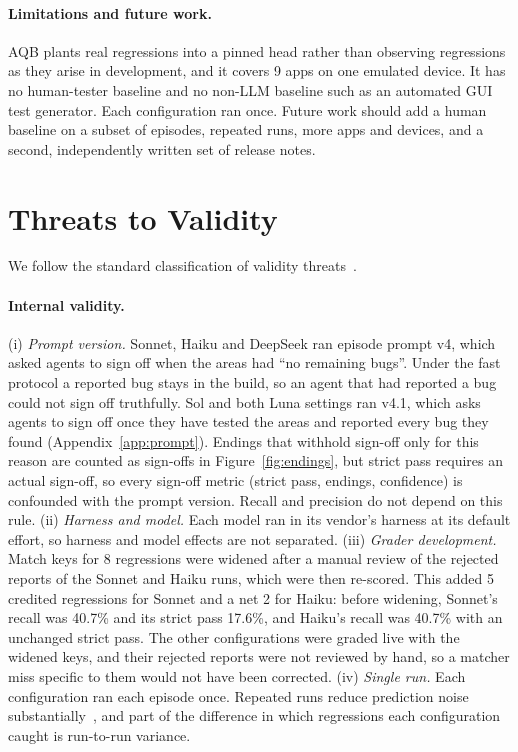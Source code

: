 \documentclass[sigconf]{acmart}
\newcommand{\aqb}{AQB\xspace}
\begin{document}
\paragraph{Limitations and future work.}
\aqb plants real regressions into a pinned head rather than observing regressions as they arise in
development, and it covers 9 apps on one emulated device. It has no human-tester baseline and no
non-LLM baseline such as an automated GUI test generator. Each configuration ran once. Future work
should add a human baseline on a subset of episodes, repeated runs, more apps and devices, and a
second, independently written set of release notes.

\section{Threats to Validity}
\label{sec:threats}
We follow the standard classification of validity threats~\cite{wohlin2012experimentation}.

\paragraph{Internal validity.}
(i) \emph{Prompt version.} Sonnet, Haiku and DeepSeek ran episode prompt v4, which asked agents to sign
off when the areas had ``no remaining bugs''. Under the fast protocol a reported bug stays in the
build, so an agent that had reported a bug could not sign off truthfully. Sol and both Luna settings
ran v4.1, which asks agents to sign off once they have tested the areas and reported every bug they
found (Appendix~\ref{app:prompt}). Endings that withhold sign-off only for this reason are counted as
sign-offs in Figure~\ref{fig:endings}, but strict pass requires an actual sign-off, so every sign-off
metric (strict pass, endings, confidence) is confounded with the prompt version. Recall and precision
do not depend on this rule. (ii) \emph{Harness and model.} Each model ran in its vendor's harness at
its default effort, so harness and model effects are not separated. (iii) \emph{Grader development.}
Match keys for 8 regressions were widened after a manual review of the rejected reports of the Sonnet
and Haiku runs, which were then re-scored. This added 5 credited regressions for Sonnet and a net 2
for Haiku: before widening, Sonnet's recall was 40.7\% and its strict pass 17.6\%, and Haiku's recall
was 40.7\% with an unchanged strict pass. The other configurations were graded live with the widened
keys, and their rejected reports were not reviewed by hand, so a matcher miss specific to them would
not have been corrected. (iv) \emph{Single run.} Each configuration ran each episode once. Repeated
runs reduce prediction noise substantially~\cite{wang2025noises}, and part of the difference in which
regressions each configuration caught is run-to-run variance.
\end{document}
